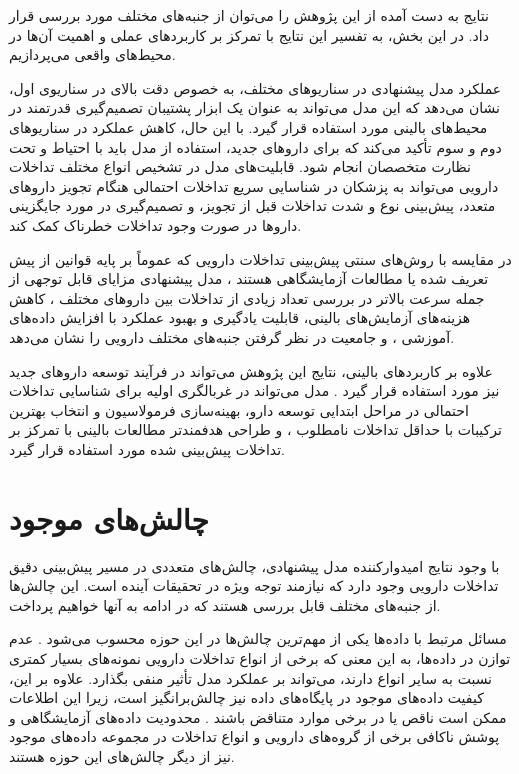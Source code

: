 نتایج به دست آمده از این پژوهش را می‌توان از جنبه‌های مختلف مورد بررسی قرار داد. در این بخش، به تفسیر این نتایج با تمرکز بر کاربردهای عملی و اهمیت آن‌ها در محیط‌های واقعی می‌پردازیم.

عملکرد مدل پیشنهادی در سناریوهای مختلف، به خصوص دقت بالای  در سناریوی اول، نشان می‌دهد که این مدل می‌تواند به عنوان یک ابزار پشتیبان تصمیم‌گیری قدرتمند در محیط‌های بالینی مورد استفاده قرار گیرد. با این حال، کاهش عملکرد در سناریوهای دوم و سوم تأکید می‌کند که برای داروهای جدید، استفاده از مدل باید با احتیاط و تحت نظارت متخصصان انجام شود. قابلیت‌های مدل در تشخیص انواع مختلف تداخلات دارویی می‌تواند به پزشکان در شناسایی سریع تداخلات احتمالی هنگام تجویز داروهای متعدد، پیش‌بینی نوع و شدت تداخلات قبل از تجویز، و تصمیم‌گیری در مورد جایگزینی داروها در صورت وجود تداخلات خطرناک کمک کند.

در مقایسه با روش‌های سنتی پیش‌بینی تداخلات دارویی که عموماً بر پایه قوانین از پیش تعریف شده یا مطالعات آزمایشگاهی هستند \cite{ref_glintborg2005}، مدل پیشنهادی مزایای قابل توجهی از جمله سرعت بالاتر در بررسی تعداد زیادی از تداخلات بین داروهای مختلف \cite{ref_cascorbi2012}، کاهش هزینه‌های آزمایش‌های بالینی، قابلیت یادگیری و بهبود عملکرد با افزایش داده‌های آموزشی \cite{ref_he2023}، و جامعیت در نظر گرفتن جنبه‌های مختلف دارویی را نشان می‌دهد.

علاوه بر کاربردهای بالینی، نتایج این پژوهش می‌تواند در فرآیند توسعه داروهای جدید نیز مورد استفاده قرار گیرد \cite{ref_ryu2018}. مدل می‌تواند در غربالگری اولیه برای شناسایی تداخلات احتمالی در مراحل ابتدایی توسعه دارو، بهینه‌سازی فرمولاسیون و انتخاب بهترین ترکیبات با حداقل تداخلات نامطلوب \cite{ref_huang2013}، و طراحی هدفمندتر مطالعات بالینی با تمرکز بر تداخلات پیش‌بینی شده مورد استفاده قرار گیرد.

\section{چالش‌های موجود}

با وجود نتایج امیدوارکننده مدل پیشنهادی، چالش‌های متعددی در مسیر پیش‌بینی دقیق تداخلات دارویی وجود دارد که نیازمند توجه ویژه در تحقیقات آینده است. این چالش‌ها از جنبه‌های مختلف قابل بررسی هستند که در ادامه به آنها خواهیم پرداخت.

مسائل مرتبط با داده‌ها یکی از مهم‌ترین چالش‌ها در این حوزه محسوب می‌شود \cite{ref_wang2017}. عدم توازن در داده‌ها، به این معنی که برخی از انواع تداخلات دارویی نمونه‌های بسیار کمتری نسبت به سایر انواع دارند، می‌تواند بر عملکرد مدل تأثیر منفی بگذارد. علاوه بر این، کیفیت داده‌های موجود در پایگاه‌های داده نیز چالش‌برانگیز است، زیرا این اطلاعات ممکن است ناقص یا در برخی موارد متناقض باشند \cite{ref_deng2020}. محدودیت داده‌های آزمایشگاهی و پوشش ناکافی برخی از گروه‌های دارویی و انواع تداخلات در مجموعه داده‌های موجود نیز از دیگر چالش‌های این حوزه هستند.

